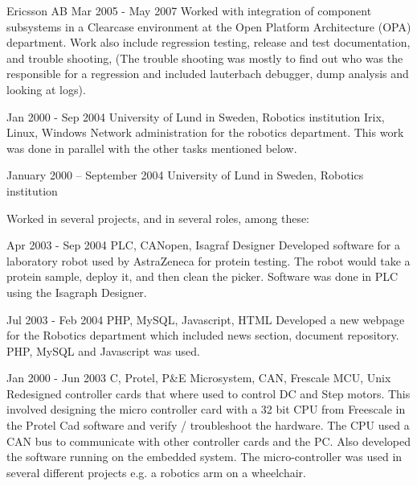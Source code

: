 \documentclass[a4paper]{article}
\begin{document}
Ericsson AB	Mar 2005 - May 2007	
Worked with integration of component subsystems in a Clearcase environment at the Open Platform Architecture (OPA) department. Work also include regression testing, release and test documentation, and trouble shooting, (The trouble shooting was mostly to find out who was the responsible for a regression and included lauterbach debugger, dump analysis and looking at logs). 

Jan 2000 - Sep 2004
University of Lund in Sweden, Robotics institution		
Irix, Linux, Windows
Network administration for the robotics department. This work was done in parallel with the other tasks mentioned below.
 

January 2000 – September 2004
University of Lund in Sweden, Robotics institution

Worked in several projects, and in several roles, among these:

Apr 2003 - Sep 2004	
PLC, CANopen, Isagraf Designer
Developed software for a laboratory robot used by AstraZeneca for protein testing. The robot would take a protein sample, deploy it, and then clean the picker. Software was done in PLC using the Isagraph Designer.
 
Jul 2003 - Feb 2004
PHP, MySQL, Javascript, HTML
Developed a new webpage for the Robotics department which included news section, document repository. PHP, MySQL and Javascript was used. 
 
Jan 2000 - Jun 2003
C, Protel, P\&E Microsystem, CAN, Frescale MCU, Unix
Redesigned  controller cards that where used to control DC and Step motors. This involved designing    the micro controller card with a 32 bit CPU from Freescale in the Protel Cad software and verify / troubleshoot the hardware. The CPU used a CAN bus to communicate with other controller cards and the PC.  Also developed the software running on the embedded system. The micro-controller was used in several different projects e.g. a robotics arm on a wheelchair.
\end{document}
